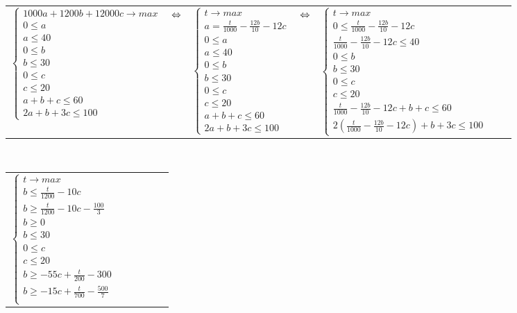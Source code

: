 \documentclass{article}
\begin{document}
	\begin{center}
		\begin{tabular}{ccccccc}
			$ \begin{cases}
			1000a + 1200b + 12000c \rightarrow max \\
			0 \leq a  \\
			a \leq 40 \\
			0 \leq b \\
			b \leq 30 \\
			0 \leq c \\
			c \leq 20 \\
			a+b+c \leq 60 \\
			2a+b+3c \leq 100
			\end{cases} $
			
			& $\hfill \Leftrightarrow \hfill$ &
			
			$ \begin{cases}
			t \rightarrow max \\
			a = \frac{t}{1000} - \frac{12b}{10} - 12c \\
			0 \leq a  \\
			a \leq 40 \\
			0 \leq b \\
			b \leq 30 \\
			0 \leq c \\
			c \leq 20 \\
			a+b+c \leq 60 \\
			2a+b+3c \leq 100
			\end{cases} $
			
			& $\hfill \Leftrightarrow \hfill$ &
			
			$ \begin{cases}
			t \rightarrow max \\
			0 \leq \frac{t}{1000} - \frac{12b}{10} - 12c  \\
			\frac{t}{1000} - \frac{12b}{10} - 12c \leq 40 \\
			0 \leq b \\
			b \leq 30 \\
			0 \leq c \\
			c \leq 20 \\
			\frac{t}{1000} - \frac{12b}{10} - 12c+b+c \leq 60 \\
			2(\frac{t}{1000} - \frac{12b}{10} - 12c)+b+3c \leq 100
			\end{cases} $
		\end{tabular} \\
		\begin{tabular}{cccccc}
			$ \begin{cases}
			t \rightarrow max \\
			b \leq \frac{t}{1200} -10c \\
			b \geq \frac{t}{1200} -10c - \frac{100}{3}  \\
			b \geq 0 \\
			b \leq 30 \\
			0 \leq c \\
			c \leq 20 \\
			b \geq -55c + \frac{t}{200} -300 \\
			b \geq -15c + \frac{t}{700} - \frac{500}{7} \\
			\end{cases} $
			

\end{tabular}
\end{center}
\end{document}
